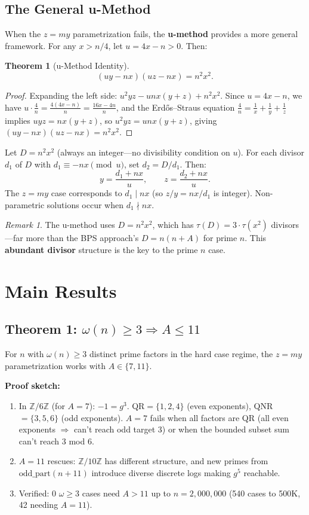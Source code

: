 \documentclass[11pt]{article}
\newtheorem{theorem}{Theorem}
\theoremstyle{remark}
\newtheorem{remark}{Remark}
\newcommand{\Z}{\mathbb{Z}}
\begin{document}
\subsection{The General u-Method}

When the $z=my$ parametrization fails, the \textbf{u-method} provides a more general framework. For any $x > n/4$, let $u = 4x - n > 0$. Then:

\begin{theorem}[u-Method Identity]
\[
(uy - nx)(uz - nx) = n^2 x^2.
\]
\end{theorem}

\begin{proof}
Expanding the left side: $u^2 yz - unx(y+z) + n^2 x^2$. Since $u = 4x - n$, we have $u \cdot \frac{4}{n} = \frac{4(4x-n)}{n} = \frac{16x - 4n}{n}$, and the Erd\H{o}s--Straus equation $\frac{4}{n} = \frac{1}{x} + \frac{1}{y} + \frac{1}{z}$ implies $uyz = nx(y+z)$, so $u^2 yz = unx(y+z)$, giving $(uy-nx)(uz-nx) = n^2 x^2$.
\end{proof}

Let $D = n^2 x^2$ (always an integer---no divisibility condition on $u$). For each divisor $d_1$ of $D$ with $d_1 \equiv -nx \pmod{u}$, set $d_2 = D/d_1$. Then:
\[
y = \frac{d_1 + nx}{u}, \qquad z = \frac{d_2 + nx}{u}.
\]
The $z=my$ case corresponds to $d_1 \mid nx$ (so $z/y = nx/d_1$ is integer). Non-parametric solutions occur when $d_1 \nmid nx$.

\begin{remark}
The u-method uses $D = n^2 x^2$, which has $\tau(D) = 3 \cdot \tau(x^2)$ divisors---far more than the BPS approach's $D = n(n+A)$ for prime $n$. This \textbf{abundant divisor} structure is the key to the prime $n$ case.
\end{remark}

\section{Main Results}

\subsection{Theorem 1: $\omega(n) \geq 3 \Rightarrow A \leq 11$}

For $n$ with $\omega(n) \geq 3$ distinct prime factors in the hard case regime, the $z=my$ parametrization works with $A \in \{7, 11\}$.

\textbf{Proof sketch:}
\begin{enumerate}
\item In $\Z/6\Z$ (for $A=7$): $-1 = g^3$. QR$=\{1,2,4\}$ (even exponents), QNR$=\{3,5,6\}$ (odd exponents). $A=7$ fails when all factors are QR (all even exponents $\Rightarrow$ can't reach odd target 3) or when the bounded subset sum can't reach 3 mod 6.
\item $A=11$ rescues: $\Z/10\Z$ has different structure, and new primes from $\text{odd\_part}(n+11)$ introduce diverse discrete logs making $g^5$ reachable.
\item Verified: 0 $\omega \geq 3$ cases need $A > 11$ up to $n = 2{,}000{,}000$ (540 cases to 500K, 42 needing $A=11$).
\end{enumerate}
\end{document}
